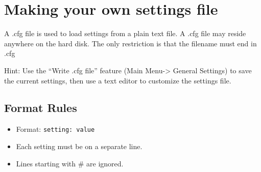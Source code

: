 \section{\label{ref:SettingsFile}Making your own settings file}
A .cfg file is used to load settings from a plain text file. A .cfg file
may reside anywhere on the hard disk. The only restriction is that the
filename must end in .cfg

Hint: Use the ``Write .cfg file'' feature (Main Menu{}-{\textgreater} General Settings) to save the current settings, then use a text editor to customize the settings file.

\subsection{Format Rules}

\begin{itemize}
\item Format: \verb+setting: value+
\item Each setting must be on a separate line.
\item Lines starting with \# are ignored.
\end{itemize}


